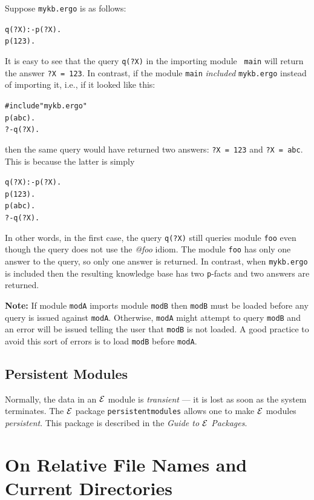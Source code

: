 \documentclass[11pt]{article}
\newcommand{\ERGO}{\mbox{\ensuremath{\cal{E}}\smaller{{\sc{RGO}}}}\xspace}
\newcommand{\FLSYSTEM}{\ERGO}
\newcommand{\ergoext}{ergo\xspace}
\begin{document}
Suppose {\tt mykb.\ergoext} is as follows:
\begin{alltt}
  q(?X) :- p(?X).
  p(123).
\end{alltt}
It is easy to see that the query {\tt q(?X)} in the importing module {\tt
  main} will return the answer {\tt ?X = 123}. In contrast, if the module
{\tt main} \emph{included} {\tt mykb.\ergoext} instead of importing it, i.e.,
if it looked like this:
\begin{alltt}
  #include "mykb.\ergoext"
  p(abc).
  ?- q(?X).
\end{alltt}
then the same query would have returned two answers: {\tt ?X = 123} and 
{\tt ?X = abc}. This is because the latter is simply
\begin{alltt}
  q(?X) :- p(?X).
  p(123).
  p(abc).
  ?- q(?X).
\end{alltt}
In other words, in the first case, the query {\tt q(?X)} still queries
module {\tt foo} even though the query does not use the \emph{@foo}    
idiom. The module {\tt foo} has only one answer to the query, so only one
answer is returned. In contrast, when {\tt mykb.\ergoext} is included then
the resulting knowledge base has two {\tt p}-facts and two answers are returned. 

\textbf{Note:} If module \texttt{modA} imports module \texttt{modB}
then \texttt{modB} must be loaded before
any query is issued against \texttt{modA}. Otherwise, \texttt{modA} might
attempt to query \texttt{modB} and an error will be issued telling the user
that \texttt{modB} is not loaded. A good practice to avoid this sort of
errors is to load \texttt{modB} before \texttt{modA}.

\subsection{Persistent Modules}\label{sec-persist-storage}

Normally, the data
in an \FLSYSTEM module is
{\em transient} --- it is lost as soon as the system terminates.
The \FLSYSTEM package {\tt persistentmodules}  allows one to make
\FLSYSTEM modules \emph{persistent}. This package is described in
the \emph{Guide to \FLSYSTEM Packages}.





\section{On Relative File Names and Current Directories}
\end{document}
